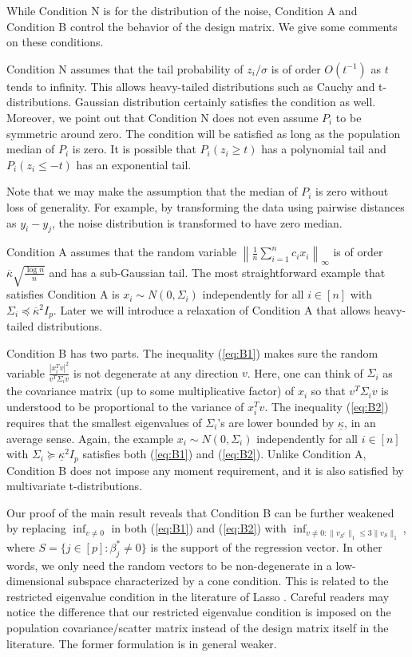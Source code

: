 While Condition N is for the distribution of the noise, Condition A and Condition B control the behavior of the design matrix. We give some comments on these conditions.

Condition N assumes that the tail probability of $z_i/\sigma$ is of order $O(t^{-1})$ as $t$ tends to infinity. This allows heavy-tailed distributions such as Cauchy and t-distributions. Gaussian distribution certainly satisfies the condition as well. Moreover, we point out that Condition N does not even assume $P_i$ to be symmetric around zero. The condition will be satisfied as long as the population median of $P_i$ is zero. It is possible that $P_i(z_i\geq t)$ has a polynomial tail and $P_i(z_i\leq -t)$ has an exponential tail.

Note that we may make the assumption that the median of $P_i$ is zero without loss
of generality. For example, by transforming the data using pairwise
distances as $y_i - y_j$, the noise distribution is transformed to have
zero median.

Condition A assumes that the random variable $\left\|\frac{1}{n}\sum_{i=1}^nc_ix_i\right\|_{\infty}$ is of order $\overline{\kappa}\sqrt{\frac{\log n}{n}}$ and has a sub-Gaussian tail. The most straightforward example that satisfies Condition A is $x_i\sim N(0,\Sigma_i)$ independently for all $i\in[n]$ with $\Sigma_i\preceq \overline{\kappa}^2I_p$. Later we will introduce a relaxation of Condition A that allows heavy-tailed distributions.

Condition B has two parts. The inequality (\ref{eq:B1}) makes sure the random variable $\frac{|x_i^Tv|^2}{v^T\Sigma_i v}$ is not degenerate at any direction $v$. Here, one can think of $\Sigma_i$ as the covariance matrix (up to some multiplicative factor) of $x_i$ so that $v^T\Sigma_iv$ is understood to be proportional to the variance of $x_i^Tv$. The inequality (\ref{eq:B2}) requires that the smallest eigenvalues of $\Sigma_i$'s are lower bounded by $\underline{\kappa}$, in an average sense. Again, the example $x_i\sim N(0,\Sigma_i)$ independently for all $i\in[n]$ with $\Sigma_i\succeq \underline{\kappa}^2I_p$ satisfies both (\ref{eq:B1}) and (\ref{eq:B2}). Unlike Condition A, Condition B does not impose any moment requirement, and it is also satisfied by multivariate t-distributions.

Our proof of the main result reveals that Condition B can be further weakened by replacing $\inf_{v\neq 0}$ in both (\ref{eq:B1}) and (\ref{eq:B2}) with $\inf_{v\neq 0: \|v_{S^c}\|_1\leq 3\|v_S\|_1}$, where $S=\{j\in[p]:\beta_j^*\neq 0\}$ is the support of the regression vector. In other words, we only need the random vectors to be non-degenerate in a low-dimensional subspace characterized by a cone condition. This is related to the restricted eigenvalue condition in the literature of Lasso \citep{bickel2009simultaneous}. Careful readers may notice the difference that our restricted eigenvalue condition is imposed on the population covariance/scatter matrix instead of the design matrix itself in the literature. The former formulation is in general weaker.


